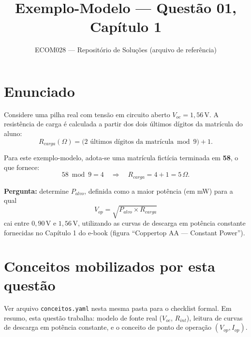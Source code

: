 \documentclass[12pt]{article}
\title{Exemplo-Modelo --- Questão 01, Capítulo 1}
\author{ECOM028 --- Repositório de Soluções (arquivo de referência)}
\date{}
\begin{document}
\maketitle

\section*{Enunciado}

Considere uma pilha real com tensão em circuito aberto
$V_{oc} = 1{,}56\,\text{V}$. A resistência de carga é calculada a partir dos
dois últimos dígitos da matrícula do aluno:
\[
R_{carga}(\Omega) = \big(\text{2 últimos dígitos da matrícula} \bmod 9\big) + 1.
\]

Para este exemplo-modelo, adota-se uma matrícula fictícia terminada em
\textbf{58}, o que fornece:
\[
58 \bmod 9 = 4 \quad \Rightarrow \quad R_{carga} = 4 + 1 = 5\,\Omega.
\]

\textbf{Pergunta:} determine $P_{alvo}$, definida como a maior potência (em
mW) para a qual
\[
V_{op} = \sqrt{P_{alvo} \times R_{carga}}
\]
cai entre $0{,}90\,\text{V}$ e $1{,}56\,\text{V}$, utilizando as curvas de
descarga em potência constante fornecidas no Capítulo 1 do e-book
(figura ``Coppertop AA --- Constant Power'').

\section*{Conceitos mobilizados por esta questão}

Ver arquivo \texttt{conceitos.yaml} nesta mesma pasta para o checklist
formal. Em resumo, esta questão trabalha: modelo de fonte real
($V_{oc}$, $R_{int}$), leitura de curvas de descarga em potência constante,
e o conceito de ponto de operação $(V_{op}, I_{op})$.
\end{document}

